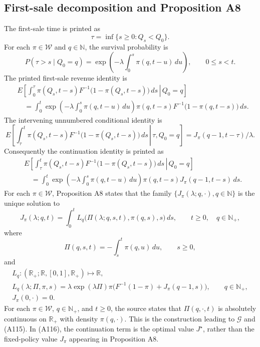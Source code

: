 \documentclass{article}
\begin{document}
\subsection*{First-sale decomposition and Proposition A8}
The first-sale time is printed as
\[
\tau=\inf\{s\geq0:Q_s<Q_0\}.
\]
For each $\pi\in\mathcal W$ and $q\in\mathbb N$, the survival probability is
\begin{equation}
P(\tau>s\mid Q_0=q)
=\exp\left(-\lambda\int_0^s\pi(q,t-u)\,du\right),
\qquad 0\leq s<t.
\tag{A110}
\end{equation}
The printed first-sale revenue identity is
\begin{equation}
\begin{aligned}
&E\left[\left.\int_0^\tau
\pi(Q_s,t-s)F^{-1}\bigl(1-\pi(Q_s,t-s)\bigr)\,ds
\,\right|\,Q_0=q\right]\\
&\quad=\int_0^t
\exp\left(-\lambda\int_0^s\pi(q,t-u)\,du\right)
\pi(q,t-s)F^{-1}\bigl(1-\pi(q,t-s)\bigr)\,ds.
\end{aligned}\tag{A111}
\end{equation}
The intervening unnumbered conditional identity is
\[
E\left[\left.\int_\tau^t
\pi(Q_s,t-s)F^{-1}\bigl(1-\pi(Q_s,t-s)\bigr)\,ds
\,\right|\,\tau,Q_0=q\right]
=J_\pi(q-1,t-\tau)/\lambda.
\]
Consequently the continuation identity is printed as
\begin{equation}
\begin{aligned}
&E\left[\left.\int_\tau^t
\pi(Q_s,t-s)F^{-1}\bigl(1-\pi(Q_s,t-s)\bigr)\,ds
\,\right|\,Q_0=q\right]\\
&\quad=\int_0^t
\exp\left(-\lambda\int_0^s\pi(q,t-u)\,du\right)
\pi(q,t-s)J_\pi(q-1,t-s)\,ds.
\end{aligned}\tag{A112}
\end{equation}
For each $\pi\in\mathcal W$, Proposition A8 states that the family
$\{J_\pi(\lambda;q,\cdot),q\in\mathbb N\}$ is the unique solution to
\begin{equation}
J_\pi(\lambda;q,t)
=\int_0^t L_q\bigl(\Pi(\lambda;q,s,t),\pi(q,s),s\bigr)\,ds,
\qquad t\geq0,\quad q\in\mathbb N_+,
\tag{A113}
\end{equation}
where
\begin{equation}
\Pi(q,s,t)=-\int_s^t\pi(q,u)\,du,
\qquad s\geq0,
\tag{A114}
\end{equation}
and
\[
\begin{gathered}
L_q:(\mathbb R_+;\mathbb R,[0,1],\mathbb R_+)\longmapsto\mathbb R,\\
L_q(\lambda;\Pi,\pi,s)
=\lambda\exp(\lambda\Pi)\pi
\bigl(F^{-1}(1-\pi)+J_\pi(q-1,s)\bigr),
\qquad q\in\mathbb N_+,\\
J_\pi(0,\cdot)=0.
\end{gathered}
\]
For each $\pi\in\mathcal W$, $q\in\mathbb N_+$, and $t\geq0$, the source states that $\Pi(q,\cdot,t)$ is absolutely continuous on $\mathbb R_+$ with density $\pi(q,\cdot)$. This is the construction leading to $\mathcal G$ and (A115). In (A116), the continuation term is the optimal value $J^\star$, rather than the fixed-policy value $J_\pi$ appearing in Proposition A8.
\end{document}
